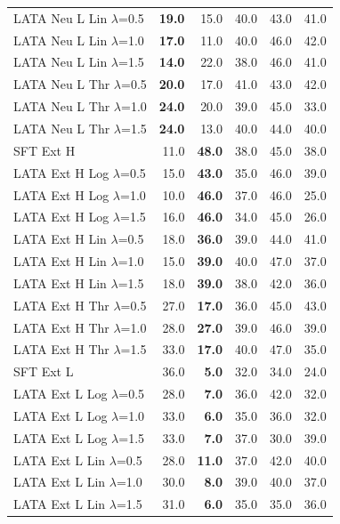 \begin{longtable}{lrrrrr}
LATA Neu L Lin $\lambda$=0.5 & \textbf{19.0} & 15.0 & 40.0 & 43.0 & 41.0 \\
LATA Neu L Lin $\lambda$=1.0 & \textbf{17.0} & 11.0 & 40.0 & 46.0 & 42.0 \\
LATA Neu L Lin $\lambda$=1.5 & \textbf{14.0} & 22.0 & 38.0 & 46.0 & 41.0 \\
LATA Neu L Thr $\lambda$=0.5 & \textbf{20.0} & 17.0 & 41.0 & 43.0 & 42.0 \\
LATA Neu L Thr $\lambda$=1.0 & \textbf{24.0} & 20.0 & 39.0 & 45.0 & 33.0 \\
LATA Neu L Thr $\lambda$=1.5 & \textbf{24.0} & 13.0 & 40.0 & 44.0 & 40.0 \\
SFT Ext H & 11.0 & \textbf{48.0} & 38.0 & 45.0 & 38.0 \\
LATA Ext H Log $\lambda$=0.5 & 15.0 & \textbf{43.0} & 35.0 & 46.0 & 39.0 \\
LATA Ext H Log $\lambda$=1.0 & 10.0 & \textbf{46.0} & 37.0 & 46.0 & 25.0 \\
LATA Ext H Log $\lambda$=1.5 & 16.0 & \textbf{46.0} & 34.0 & 45.0 & 26.0 \\
LATA Ext H Lin $\lambda$=0.5 & 18.0 & \textbf{36.0} & 39.0 & 44.0 & 41.0 \\
LATA Ext H Lin $\lambda$=1.0 & 15.0 & \textbf{39.0} & 40.0 & 47.0 & 37.0 \\
LATA Ext H Lin $\lambda$=1.5 & 18.0 & \textbf{39.0} & 38.0 & 42.0 & 36.0 \\
LATA Ext H Thr $\lambda$=0.5 & 27.0 & \textbf{17.0} & 36.0 & 45.0 & 43.0 \\
LATA Ext H Thr $\lambda$=1.0 & 28.0 & \textbf{27.0} & 39.0 & 46.0 & 39.0 \\
LATA Ext H Thr $\lambda$=1.5 & 33.0 & \textbf{17.0} & 40.0 & 47.0 & 35.0 \\
SFT Ext L & 36.0 & \textbf{5.0} & 32.0 & 34.0 & 24.0 \\
LATA Ext L Log $\lambda$=0.5 & 28.0 & \textbf{7.0} & 36.0 & 42.0 & 32.0 \\
LATA Ext L Log $\lambda$=1.0 & 33.0 & \textbf{6.0} & 35.0 & 36.0 & 32.0 \\
LATA Ext L Log $\lambda$=1.5 & 33.0 & \textbf{7.0} & 37.0 & 30.0 & 39.0 \\
LATA Ext L Lin $\lambda$=0.5 & 28.0 & \textbf{11.0} & 37.0 & 42.0 & 40.0 \\
LATA Ext L Lin $\lambda$=1.0 & 30.0 & \textbf{8.0} & 39.0 & 40.0 & 37.0 \\
LATA Ext L Lin $\lambda$=1.5 & 31.0 & \textbf{6.0} & 35.0 & 35.0 & 36.0 \\

\end{longtable}
